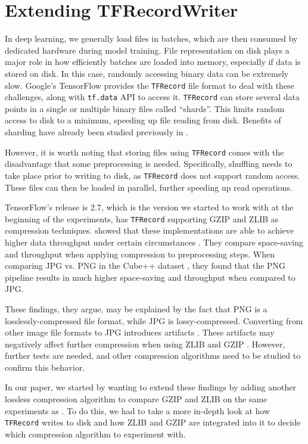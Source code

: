\documentclass[sigconf,nonacm]{acmart}
\begin{document}
\section{Extending TFRecordWriter}
In deep learning, we generally load files in batches, which are then consumed by dedicated hardware during model training.
File representation on disk plays a major role in how efficiently batches are loaded into memory, especially if data is stored on disk.
In this case, randomly accessing binary data can be extremely slow.
Google's TensorFlow provides the \texttt{TFRecord} file format to deal with these challenges, along with \texttt{tf.data} API to access it.
\texttt{TFRecord} can store several data points in a single or multiple binary files called ``shards''.
This limits random access to disk to a minimum, speeding up file reading from disk.
Benefits of sharding have already been studied previously in \cite{aizman2020highperformance}.

However, it is worth noting that storing files using \texttt{TFRecord} comes with the disadvantage that some preprocessing is needed.
Specifically, shuffling needs to take place prior to writing to disk, as \texttt{TFRecord} does not support random access.
These files can then be loaded in parallel, further speeding up read operations.

TensorFlow's release is 2.7, which is the version we started to work with at the beginning of the experiments, has \texttt{TFRecord} supporting GZIP and ZLIB as compression techniques.
\citet{isenko2022bottleneck} showed that these implementations are able to achieve higher data throughput under certain circumstances \cite{isenko2022bottleneck}.
They compare space-saving and throughput when applying compression to preprocessing steps.
When comparing JPG vs. PNG in the Cube++ dataset \cite{ershov2020cube++,ershov2020problems}, they found that the PNG pipeline results in much higher space-saving and throughput when compared to JPG.

These findings, they argue, may be explained by the fact that PNG is a losslessly-compressed file format, while JPG is lossy-compressed.
Converting from other image file formats to JPG introduces artifacts \cite{liu2018deepn-jpeg}.
These artifacts may negatively affect further compression when using ZLIB and GZIP \cite{isenko2022bottleneck}.
However, further tests are needed, and other compression algorithms need to be studied to confirm this behavior.

In our paper, we started by wanting to extend these findings by adding another lossless compression algorithm to compare GZIP and ZLIB on the same experiments as \cite{isenko2022bottleneck}.
To do this, we had to take a more in-depth look at how \texttt{TFRecord} writes to disk and how ZLIB and GZIP are integrated into it to decide which compression algorithm to experiment with.
\end{document}
